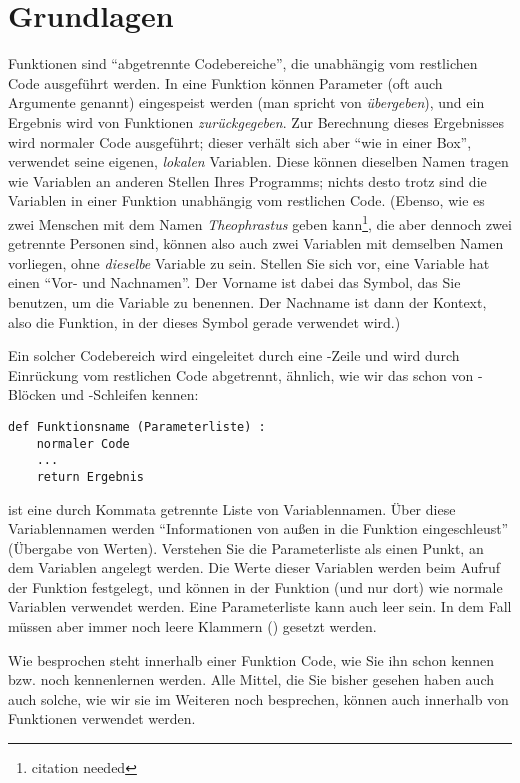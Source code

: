 \section{Grundlagen}
Funktionen sind \enquote{abgetrennte Codebereiche}, die unabhängig vom restlichen Code ausgeführt werden. In eine Funktion können Parameter (oft auch Argumente genannt) eingespeist werden (man spricht von \emph{übergeben}), und ein Ergebnis wird von Funktionen \emph{zurückgegeben}. Zur Berechnung dieses Ergebnisses wird normaler Code ausgeführt; dieser verhält sich aber \enquote{wie in einer Box}, \ie verwendet seine eigenen, \emph{lokalen} Variablen. Diese können dieselben Namen tragen wie Variablen an anderen Stellen Ihres Programms; nichts desto trotz sind die Variablen in einer Funktion unabhängig vom restlichen Code. (Ebenso, wie es zwei Menschen mit dem Namen \emph{Theophrastus} geben kann\footnote{citation needed}, die aber dennoch zwei getrennte Personen sind, können also auch zwei Variablen mit demselben Namen vorliegen, ohne \emph{dieselbe} Variable zu sein. Stellen Sie sich vor, eine Variable hat einen \enquote{Vor- und Nachnamen}. Der Vorname ist dabei das Symbol, das Sie benutzen, um die Variable zu benennen. Der Nachname ist dann der Kontext, also die Funktion, in der dieses Symbol gerade verwendet wird.)

Ein solcher Codebereich wird eingeleitet durch eine -Zeile und wird durch Einrückung vom restlichen Code abgetrennt, ähnlich, wie wir das schon von -Blöcken und -Schleifen kennen:

\begin{codebox}
\begin{verbatim}
def Funktionsname (Parameterliste) :
    normaler Code
    ...
    return Ergebnis
\end{verbatim}
\end{codebox}

 ist eine durch Kommata getrennte Liste von Variablennamen. Über diese Variablennamen werden \enquote{Informationen von außen in die Funktion eingeschleust} (Übergabe von Werten). Verstehen Sie die Parameterliste als einen Punkt, an dem Variablen angelegt werden. Die Werte dieser Variablen werden beim Aufruf der Funktion festgelegt, und können in der Funktion (und nur dort) wie normale Variablen verwendet werden. Eine Parameterliste kann auch leer sein. In dem Fall müssen aber immer noch  leere Klammern () gesetzt werden.

Wie besprochen steht innerhalb einer Funktion Code, wie Sie ihn schon kennen bzw. noch kennenlernen werden. Alle Mittel, die Sie bisher gesehen haben auch auch solche, wie wir sie im Weiteren noch besprechen, können auch innerhalb von Funktionen verwendet werden.

